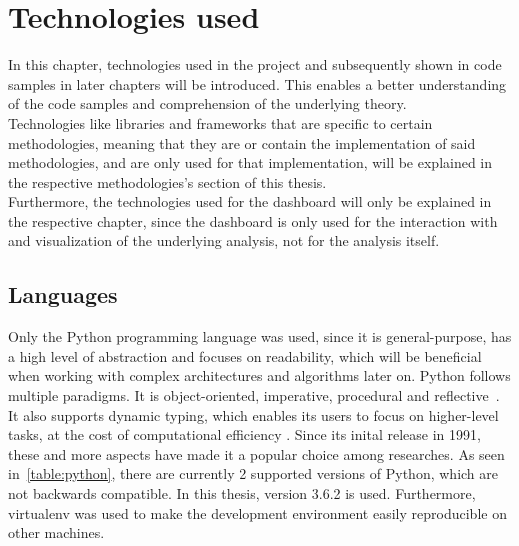

\chapter{Technologies used}
\label{ch:technologiesUsed}

In this chapter, technologies used in the project and subsequently shown in code samples in later chapters will be introduced.
This enables a better understanding of the code samples and comprehension of the underlying theory.\\
Technologies like libraries and frameworks that are specific to certain methodologies,
meaning that they are or contain the implementation of said methodologies,
and are only used for that implementation,
will be explained in the respective methodologies's section of this thesis.\\
Furthermore, the technologies used for the dashboard will only be explained in the respective chapter,
since the dashboard is only used for the interaction with and visualization of the underlying analysis,
not for the analysis itself.

\section{Languages}
\label{sec:languages}

Only the Python programming language was used, since it is general-purpose,
has a high level of abstraction and focuses on readability,
which will be beneficial when working with complex architectures and algorithms later on.
Python follows multiple paradigms.
It is object-oriented, imperative, procedural and reflective~\cite{van2007python}.
It also supports dynamic typing, which enables its users to focus on higher-level tasks, at the cost of computational efficiency \cite{Perez-schofield2010}.
Since its inital release in 1991, these and more aspects have made it a popular choice among researches.
As seen in~\ref{table:python}, there are currently 2 supported versions of Python, which are not backwards compatible.
In this thesis, version 3.6.2 is used.
Furthermore, virtualenv was used to make the development environment easily reproducible on other machines.

